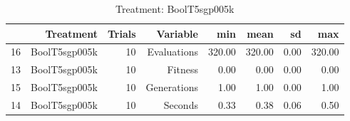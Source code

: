 \begin{table}[ht]
\centering
\begin{tabular}{rrrrrrrr}
  \hline
 & Treatment & Trials & Variable & min & mean & sd & max \\ 
  \hline
16 & BoolT5sgp005k &  10 & Evaluations & 320.00 & 320.00 & 0.00 & 320.00 \\ 
  13 & BoolT5sgp005k &  10 & Fitness & 0.00 & 0.00 & 0.00 & 0.00 \\ 
  15 & BoolT5sgp005k &  10 & Generations & 1.00 & 1.00 & 0.00 & 1.00 \\ 
  14 & BoolT5sgp005k &  10 & Seconds & 0.33 & 0.38 & 0.06 & 0.50 \\ 
   \hline
\end{tabular}
\caption{Treatment: BoolT5sgp005k} 
\end{table}
